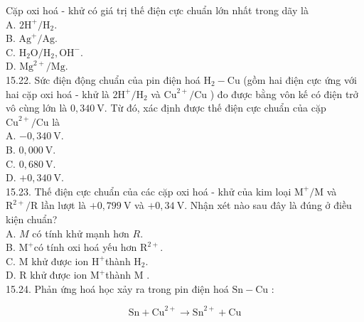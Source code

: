 \documentclass[10pt]{article}
\begin{document}
Cặp oxi hoá - khử có giá trị thế điện cực chuẩn lớn nhất trong dãy là\\
A. $2 \mathrm{H}^{+} / \mathrm{H}_{2}$.\\
B. $\mathrm{Ag}^{+} / \mathrm{Ag}$.\\
C. $\mathrm{H}_{2} \mathrm{O} / \mathrm{H}_{2}, \mathrm{OH}^{-}$.\\
D. $\mathrm{Mg}^{2+} / \mathrm{Mg}$.\\
15.22. Sức điện động chuẩn của pin điện hoá $\mathrm{H}_{2}-\mathrm{Cu}$ (gồm hai điện cực ứng với hai cặp oxi hoá - khử là $2 \mathrm{H}^{+} / \mathrm{H}_{2}$ và $\mathrm{Cu}^{2+} / \mathrm{Cu}$ ) đo được bằng vôn kế có điện trở vô cùng lớn là $0,340 \mathrm{~V}$. Từ đó, xác định được thế điện cực chuẩn của cặp $\mathrm{Cu}^{2+} / \mathrm{Cu}$ là\\
A. $-0,340 \mathrm{~V}$.\\
B. $0,000 \mathrm{~V}$.\\
C. $0,680 \mathrm{~V}$.\\
D. $+0,340 \mathrm{~V}$.\\
15.23. Thế điện cực chuẩn của các cặp oxi hoá - khử của kim loại $\mathrm{M}^{+} / \mathrm{M}$ và $\mathrm{R}^{2+} / \mathrm{R}$ lần lượt là $+0,799 \mathrm{~V}$ và $+0,34 \mathrm{~V}$. Nhận xét nào sau đây là đúng ở điều kiện chuẩn?\\
A. $M$ có tính khử mạnh hơn $R$.\\
B. $\mathrm{M}^{+}$có tính oxi hoá yếu hơn $\mathrm{R}^{2+}$.\\
C. M khử được ion $\mathrm{H}^{+}$thành $\mathrm{H}_{2}$.\\
D. R khử được ion $\mathrm{M}^{+}$thành M .\\
15.24. Phản ứng hoá học xảy ra trong pin điện hoá $\mathrm{Sn}-\mathrm{Cu}$ :

$$
\mathrm{Sn}+\mathrm{Cu}^{2+} \longrightarrow \mathrm{Sn}^{2+}+\mathrm{Cu}
$$
\end{document}
